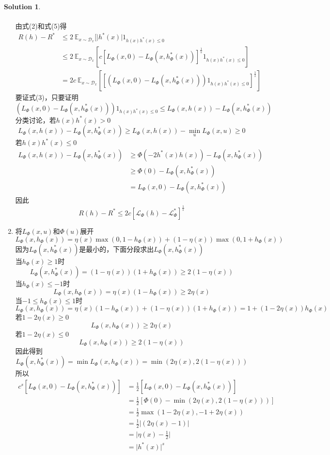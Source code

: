 \documentclass[a4paper,UTF8]{article}
\theoremstyle{definition}
\newtheorem*{solution}{Solution}
\begin{document}
\begin{solution}
\begin{enumerate}[(1)]
\begin{align*}
		\end{align*}
		由式(2)和式(5)得
		\begin{align*}
			R(h)-R^* 
			&\leq 2\ \mathbb{E}_{x \sim \mathcal{D}_{x}}[\vert h^*(x)\vert 1_{h(x)h^*(x)\leq 0}\\
			&\leq 2\ \mathbb{E}_{x \sim \mathcal{D}_{x}}[c[L_{\Phi}(x, 0)-L_{\Phi}(x, h_{\Phi}^{*}(x))]^{\frac1s} 1_{h(x)h^*(x)\leq 0}]\\
			&=2c\ \mathbb{E}_{x \sim \mathcal{D}_{x}}[[(L_{\Phi}(x, 0)-L_{\Phi}(x, h_{\Phi}^{*}(x))) 1_{h(x)h^*(x)\leq 0}]^{\frac1s}]
		\end{align*}
		要证式(3)，只要证明
		\[(L_{\Phi}(x, 0)-L_{\Phi}(x, h_{\Phi}^{*}(x))) 1_{h(x)h^*(x)\leq 0} \leq L_\Phi(x,h(x))-L_\Phi(x,h_\Phi^*(x))\]
		分类讨论，若$h(x)h^*(x)>0$
		\[
		L_\Phi(x,h(x))-L_\Phi(x,h_\Phi^*(x)) \geq L_\Phi(x,h(x))-\min_uL_\Phi(x,u)\geq 0
		\]
		若$h(x)h^*(x)\leq0$
		\begin{align*}
			L_\Phi(x,h(x))-L_\Phi(x,h_\Phi^*(x)) 
			&\geq\Phi(-2 h^{*}(x) h(x))-L_\Phi(x,h_\Phi^*(x))\\
			&\geq\Phi(0)-L_\Phi(x,h_\Phi^*(x))\\
			&=L_{\Phi}(x, 0)-L_{\Phi}(x, h_{\Phi}^{*}(x))
		\end{align*}
		因此
		\[R(h)-R^{*} \leq 2 c[\mathcal{L}_{\Phi}(h)-\mathcal{L}_{\Phi}^{*}]^{\frac{1}{s}}\]
		\item
		将$L_\Phi(x,u)$和$\Phi(u)$展开
		\[L_\Phi(x,h_\Phi(x))=\eta(x)\max(0,1-h_\Phi(x))+(1-\eta(x))\max(0,1+h_\Phi(x))\]
		因为$L_\Phi(x,h_\Phi^*(x))$是最小的，下面分段求出$L_\Phi(x,h_\Phi^*(x))$\\
		当$h_\Phi(x)\geq1$时
		\[L_\Phi(x,h_\Phi^*(x))=(1-\eta(x))(1+h_\Phi(x)) \geq 2(1-\eta(x))\]
		当$h_\Phi(x)\leq-1$时
		\[L_\Phi(x,h_\Phi(x))=\eta(x)(1-h_\Phi(x)) \geq 2\eta(x)\]
		当$-1\leq h_\Phi(x) \leq1$时
		\[L_\Phi(x,h_\Phi(x))=\eta(x)(1-h_\Phi(x))+(1-\eta(x))(1+h_\Phi(x))=1+(1-2\eta(x))h_\Phi(x)\]
		若$1-2\eta(x)\geq0$
		\[L_\Phi(x,h_\Phi(x)) \geq 2\eta(x)\]
		若$1-2\eta(x)\leq0$
		\[L_\Phi(x,h_\Phi(x)) \geq 2(1-\eta(x))\]
		因此得到
		\[L_\Phi(x,h_\Phi^*(x))=\min L_\Phi(x,h_\Phi(x))=\min(2\eta(x),2(1-\eta(x)))\]
		所以
		\begin{align*}
			c^{s}[L_{\Phi}(x, 0)-L_{\Phi}(x, h_{\Phi}^{*}(x))]
			&=\frac12[L_{\Phi}(x, 0)-L_{\Phi}(x, h_{\Phi}^{*}(x))]\\
			&=\frac12[\Phi(0)-\min(2\eta(x),2(1-\eta(x)))]\\
			&=\frac12\max(1-2\eta(x),-1+2\eta(x))\\
			&=\frac12\vert(2\eta(x)-1)\vert\\
			&=\vert\eta(x)-\frac12\vert\\
			&=\vert h^*(x)\vert^s
		\end{align*}
	\end{enumerate}
\end{solution}
\end{document}
